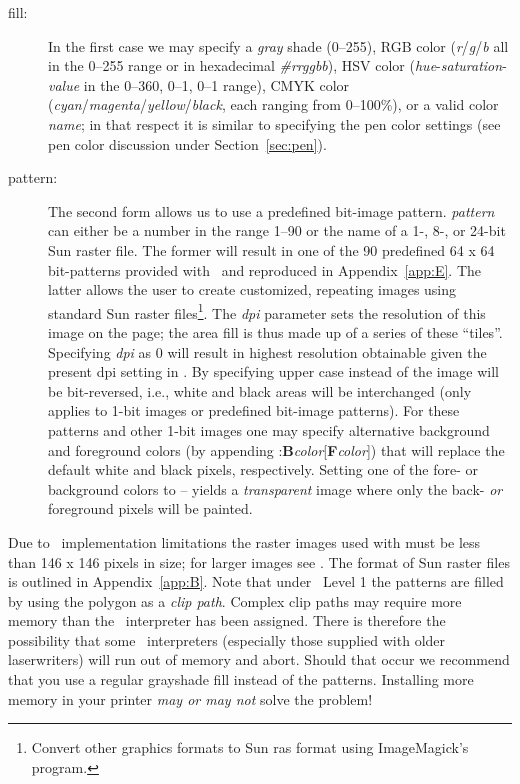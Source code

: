 \vspace{\baselineskip} 
\noindent
\begin{description}
\item [fill:]
In the first case we may specify a \emph{gray} shade (0--255), RGB color
(\emph{r}/\emph{g}/\emph{b} all in the 0--255 range or in hexadecimal \emph{\#rrggbb}), HSV color (\emph{hue}-\emph{saturation}-\emph{value}
in the 0--360, 0--1, 0--1 range), CMYK color (\emph{cyan}/\emph{magenta}/\emph{yellow}/\emph{black},
each ranging from 0--100\%), or a valid color \emph{name}; in that respect it is similar
to specifying the pen color settings (see pen color discussion under Section~\ref{sec:pen}).
\item [pattern:]
The second form allows us to use a predefined bit-image pattern.
\emph{pattern} can either be a number in the range 1--90 or the name of a 1-,
8-, or 24-bit Sun raster file.  The former will result in one of the 90
predefined 64 x 64 bit-patterns provided with \GMT\ and reproduced in Appendix~\ref{app:E}.
The latter allows the user to create customized, repeating images using
standard Sun raster files\footnote{Convert other graphics formats to Sun ras format using
ImageMagick's  program.}.  The \emph{dpi} parameter sets the resolution of
this image on the page;  the area fill is thus made up of a series of these
``tiles''.  Specifying \emph{dpi} as 0 will result in highest resolution
obtainable given the present dpi setting in .
By specifying upper case  instead of  the image will be
bit-reversed, i.e., white and black areas will be interchanged (only applies
to 1-bit images or predefined bit-image patterns).  For these patterns and
other 1-bit images one may specify alternative background and foreground
colors (by appending :\textbf{B}\emph{color}[\textbf{F}\emph{color}]) that will
replace the default white and black pixels, respectively.  Setting one of the
fore- or background colors to -- yields a \emph{transparent} image where only the
back- \emph{or} foreground pixels will be painted.
\end{description}

Due to \PS\ implementation limitations the raster images used with
 must be less than 146 x 146 pixels in size; for larger images see
.  The format of Sun raster files is outlined in Appendix~\ref{app:B}.
Note that under \PS\ Level 1 the patterns are filled by using
the polygon as a \emph{clip path}.  Complex clip paths may require
more memory than the \PS\ interpreter has been assigned.
There is therefore the possibility that some \PS\ interpreters
(especially those supplied with older laserwriters) will run out of memory
and abort.  Should that occur we recommend that you use a regular grayshade
fill instead of the patterns.  Installing more memory in your printer
\emph{may or may not} solve the problem! 

